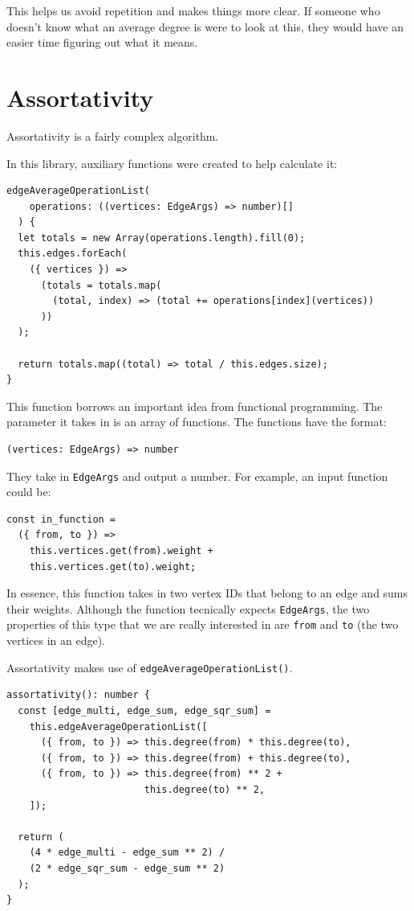This helps us avoid repetition and makes things more clear.
If someone who doesn't know what an average degree is were to look at this,
they would have an easier time figuring out what it means.

\section{Assortativity}

Assortativity is a fairly complex algorithm.


In this library, auxiliary functions were created to help calculate it:

\begin{verbatim}
edgeAverageOperationList(
    operations: ((vertices: EdgeArgs) => number)[]
  ) {
  let totals = new Array(operations.length).fill(0);
  this.edges.forEach(
    ({ vertices }) =>
      (totals = totals.map(
        (total, index) => (total += operations[index](vertices))
      ))
  );

  return totals.map((total) => total / this.edges.size);
}
\end{verbatim}

This function borrows an important idea from functional programming.
The parameter it takes in is an array of functions.
The functions have the format:

\begin{verbatim}
(vertices: EdgeArgs) => number
\end{verbatim}

They take in \texttt{EdgeArgs} and output a number.
For example, an input function could be:

\begin{verbatim}
const in_function =
  ({ from, to }) =>
    this.vertices.get(from).weight +
    this.vertices.get(to).weight;
\end{verbatim}

In essence, this function takes in two vertex IDs that belong to an edge and sums their weights.
Although the function tecnically expects \texttt{EdgeArgs},
the two properties of this type that we are really interested in are \texttt{from}
and \texttt{to} (the two vertices in an edge).

Assortativity makes use of \texttt{edgeAverageOperationList()}.

\begin{verbatim}
assortativity(): number {
  const [edge_multi, edge_sum, edge_sqr_sum] =
    this.edgeAverageOperationList([
      ({ from, to }) => this.degree(from) * this.degree(to),
      ({ from, to }) => this.degree(from) + this.degree(to),
      ({ from, to }) => this.degree(from) ** 2 +
                        this.degree(to) ** 2,
    ]);

  return (
    (4 * edge_multi - edge_sum ** 2) /
    (2 * edge_sqr_sum - edge_sum ** 2)
  );
}
\end{verbatim}

